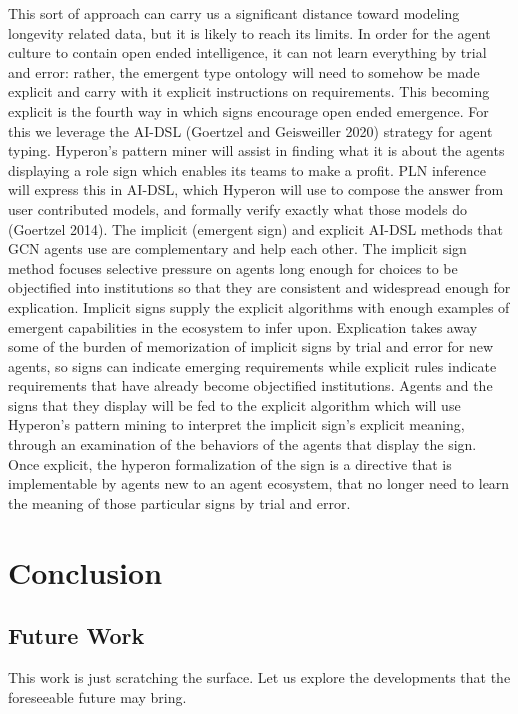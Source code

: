 \documentclass[]{report}
\begin{document}
This sort of approach can carry us a significant distance toward
modeling longevity related data, but it is likely to reach its
limits. In order for the agent culture to contain open ended
intelligence, it can not learn everything by trial and error: rather,
the emergent type ontology will need to somehow be made explicit and
carry with it explicit instructions on requirements. This becoming
explicit is the fourth way in which signs encourage open ended
emergence. For this we leverage the AI-DSL (Goertzel and Geisweiller
2020) strategy for agent typing. Hyperon’s pattern miner will assist
in finding what it is about the agents displaying a role sign which
enables its teams to make a profit. PLN inference will express this in
AI-DSL, which Hyperon will use to compose the answer from user
contributed models, and formally verify exactly what those models do
(Goertzel 2014).  The implicit (emergent sign) and explicit AI-DSL
methods that GCN agents use are complementary and help each other. The
implicit sign method focuses selective pressure on agents long enough
for choices to be objectified into institutions so that they are
consistent and widespread enough for explication. Implicit signs
supply the explicit algorithms with enough examples of emergent
capabilities in the ecosystem to infer upon. Explication takes away
some of the burden of memorization of implicit signs by trial and
error for new agents, so signs can indicate emerging requirements
while explicit rules indicate requirements that have already become
objectified institutions. Agents and the signs that they display will
be fed to the explicit algorithm which will use Hyperon's pattern
mining to interpret the implicit sign's explicit meaning, through an
examination of the behaviors of the agents that display the sign. Once
explicit, the hyperon formalization of the sign is a directive that is
implementable by agents new to an agent ecosystem, that no longer need
to learn the meaning of those particular signs by trial and error.

\chapter{Conclusion}

\section{Future Work}
This work is just scratching the surface.  Let us explore the
developments that the foreseeable future may bring.
\end{document}
